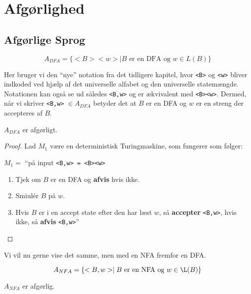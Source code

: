 \chapter{Afgørlighed}

\section{Afgørlige Sprog}%
\label{sec:decideablelanguages}

\begin{equation*}
A_{DFA} = \{<B><w> \mid B \text{ er en DFA og } w \in L(B) \}
\end{equation*}

Her bruger vi den ``nye'' notation fra det tidligere kapitel, hvor \texttt{<B>} og \texttt{<w>} bliver indkoded ved hjælp af det universelle alfabet og den universelle statemængde. Notationen kan også se ud således \texttt{<B,w>} og er ækvivalent med \texttt{<B><w>}. Dermed, når vi skriver \texttt{<B,w>} $\in A_{DFA}$ betyder det at $B$ er en DFA og $w$ er en streng der accepteres af $B$.

\begin{theorem}
  \label{teo:dfadecidable}
$A_{DFA}$ er afgørligt.
\end{theorem}

\begin{proof}
  Lad $M_{1}$ være en deterministisk Turingmaskine, som fungerer som følger:

  $M_{1} = $ ``på input \texttt{<B,w> = <B><w>}
\begin{enumerate}
  \item Tjek om $B$ er en DFA og \textbf{afvis} hvis ikke.
  \item Smiulér $B$ på $w$.
  \item Hvis $B$ er i en accept state efter den har læst $w$, så \textbf{accepter} \texttt{<B,w>}, hvis ikke, så \textbf{afvis} \texttt{<B,w>}''
\end{enumerate}
\end{proof}

Vi vil nu gerne vise det samme, men med en NFA fremfor en DFA.

\begin{equation*}
  A_{NFA} = \{<B,w> \mid B \text{ er en NFA og }w \in \L(B)\}
\end{equation*}

\begin{theorem}
$A_{NFA}$ er afgørlig.
\end{theorem}

